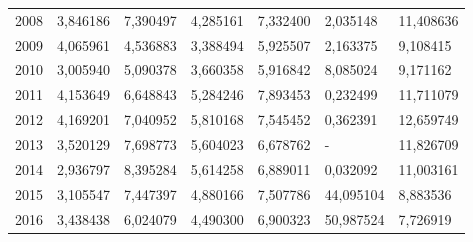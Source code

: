 \begin{table}
\begin{tabular}{p{1cm}p{2cm}p{2cm}p{2cm}p{2cm}p{2cm}p{2cm}}
 2008 &                            3,846186 &                        7,390497 &                                    4,285161 &                                  7,332400 &                2,035148 &                                          11,408636 \\
 2009 &                            4,065961 &                        4,536883 &                                    3,388494 &                                  5,925507 &                2,163375 &                                           9,108415 \\
 2010 &                            3,005940 &                        5,090378 &                                    3,660358 &                                  5,916842 &                8,085024 &                                           9,171162 \\
 2011 &                            4,153649 &                        6,648843 &                                    5,284246 &                                  7,893453 &                0,232499 &                                          11,711079 \\
 2012 &                            4,169201 &                        7,040952 &                                    5,810168 &                                  7,545452 &                0,362391 &                                          12,659749 \\
 2013 &                            3,520129 &                        7,698773 &                                    5,604023 &                                  6,678762 &                       - &                                          11,826709 \\
 2014 &                            2,936797 &                        8,395284 &                                    5,614258 &                                  6,889011 &                0,032092 &                                          11,003161 \\
 2015 &                            3,105547 &                        7,447397 &                                    4,880166 &                                  7,507786 &               44,095104 &                                           8,883536 \\
 2016 &                            3,438438 &                        6,024079 &                                    4,490300 &                                  6,900323 &               50,987524 &                                           7,726919 \\
\bottomrule
\end{tabular}
\end{table}
